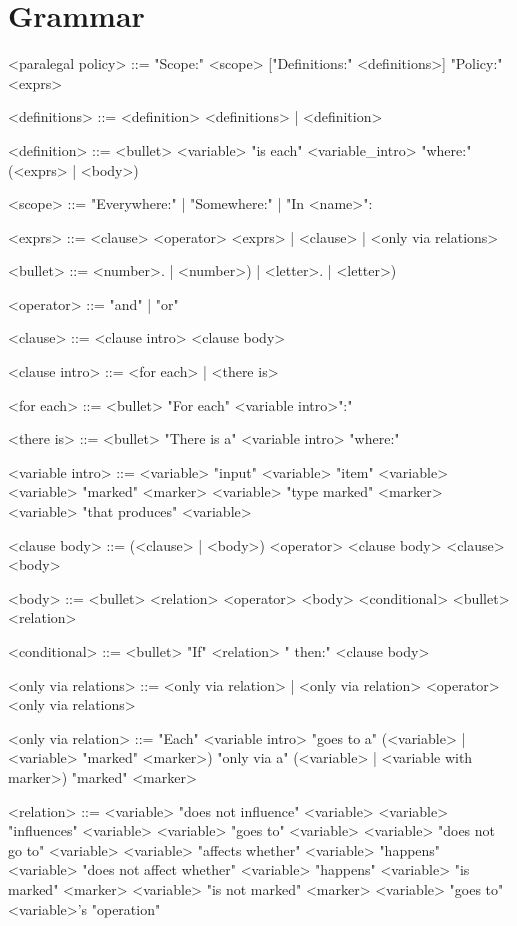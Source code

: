\appendix

\chapter{Grammar}
\label{sec:grammar}

\begin{grammar}
<paralegal policy> ::= 
    "Scope:" <scope> 
    ["Definitions:" <definitions>] 
    "Policy:" <exprs>

<definitions> ::= <definition> <definitions> | <definition>

<definition> ::=
	<bullet> <variable> "is each" <variable_intro> "where:" (<exprs> | <body>)

<scope> ::= "Everywhere:" | "Somewhere:" | "In <name>":

<exprs> ::= 
	<clause> <operator> <exprs> |
	<clause> |
	<only via relations>

<bullet> ::= <number>. | <number>) | <letter>. | <letter>)

<operator> ::= "and" | "or"

<clause> ::= <clause intro> <clause body>

<clause intro> ::= <for each> | <there is>

<for each> ::= <bullet> "For each" <variable intro>":"

<there is> ::= <bullet> "There is a" <variable intro> "where:"

<variable intro> ::= <variable> "input"
    \alt <variable> "item"
	\alt <variable>
	\alt <variable> "marked" <marker>
	\alt <variable> "type marked" <marker>
	\alt <variable> "that produces" <variable>

<clause body> ::= (<clause> | <body>) <operator> <clause body> 
	\alt <clause>
	\alt <body>

<body> ::= <bullet> <relation> <operator> <body> 
    \alt <conditional> 
    \alt <bullet> <relation>

<conditional> ::= <bullet> "If" <relation> " then:" <clause body> 

<only via relations> ::= <only via relation> | <only via relation> <operator> <only via relations>

<only via relation> ::= 
	"Each" <variable intro> "goes to a" 
    (<variable> | <variable> "marked" <marker>) 
	"only via a" (<variable> | <variable with marker>)
    "marked" <marker>

<relation> ::= <variable> "does not influence" <variable>
    \alt <variable> "influences" <variable>
	\alt <variable> "goes to" <variable>
	\alt <variable> "does not go to" <variable>
	\alt <variable> "affects whether" <variable> "happens"
	\alt <variable> "does not affect whether" <variable> "happens"
	\alt <variable> "is marked" <marker>
	\alt <variable> "is not marked" <marker>
	\alt <variable> "goes to" <variable>'s "operation"
\end{grammar}
